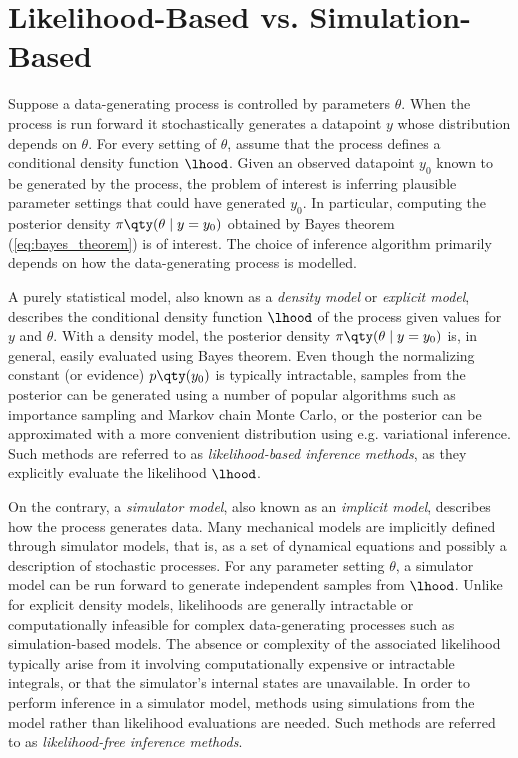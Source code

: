 \section{Likelihood-Based vs. Simulation-Based}

Suppose a data-generating process is controlled by parameters $\theta$. When the process is run forward it stochastically generates a datapoint $y$ whose distribution depends on $\theta$. For every setting of $\theta$, assume that the process defines a conditional density function $\lhood$. Given an observed datapoint $y_0$ known to be generated by the process, the problem of interest is inferring plausible parameter settings that could have generated $y_0$. In particular, computing the posterior density $\pi \qty(\theta \mid y=y_0)$ obtained by Bayes theorem (\autoref{eq:bayes_theorem}) is of interest. The choice of inference algorithm primarily depends on how the data-generating process is modelled.

A purely statistical model, also known as a \textit{density model} or \textit{explicit model}, describes the conditional density function $\lhood$ of the process given values for $y$ and $\theta$. With a density model, the posterior density $\pi \qty(\theta \mid y=y_0)$ is, in general, easily evaluated using Bayes theorem. Even though the normalizing constant (or evidence) $p\qty(y_0)$ is typically intractable, samples from the posterior can be generated using a number of popular algorithms such as importance sampling and Markov chain Monte Carlo, or the posterior can be approximated with a more convenient distribution using e.g. variational inference. Such methods are referred to as \textit{likelihood-based inference methods}, as they explicitly evaluate the likelihood $\lhood$.

On the contrary, a \textit{simulator model}, also known as an \textit{implicit model}, describes how the process generates data. Many mechanical models are implicitly defined through simulator models, that is, as a set of dynamical equations and possibly a description of stochastic processes. For any parameter setting $\theta$, a simulator model can be run forward to generate independent samples from $\lhood$. Unlike for explicit density models, likelihoods are generally intractable or computationally infeasible for complex data-generating processes such as simulation-based models. The absence or complexity of the associated likelihood typically arise from it involving computationally expensive or intractable integrals, or that the simulator's internal states are unavailable. In order to perform inference in a simulator model, methods using simulations from the model rather than likelihood evaluations are needed. Such methods are referred to as \textit{likelihood-free inference methods}.

